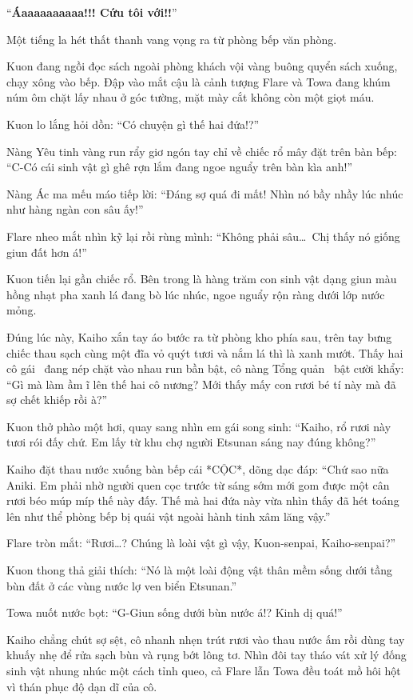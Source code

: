 \documentclass[../main.tex]{subfiles}
\begin{document}
``\textbf{Áaaaaaaaaaa!!! Cứu tôi với!!}''

Một tiếng la hét thất thanh vang vọng ra từ phòng bếp văn phòng.

Kuon đang ngồi đọc sách ngoài phòng khách vội vàng buông quyển sách xuống, chạy xông vào bếp. Đập vào mắt cậu là cảnh tượng Flare và Towa đang khúm núm ôm chặt lấy nhau ở góc tường, mặt mày cắt không còn một giọt máu.

Kuon lo lắng hỏi dồn: ``Có chuyện gì thế hai đứa!?''

Nàng Yêu tinh vàng run rẩy giơ ngón tay chỉ về chiếc rổ mây đặt trên bàn bếp: ``C-Có cái sinh vật gì ghê rợn lắm đang ngoe nguẩy trên bàn kìa anh!''

Nàng Ác ma mếu máo tiếp lời: ``Đáng sợ quá đi mất! Nhìn nó bầy nhầy lúc nhúc như hàng ngàn con sâu ấy!''

Flare nheo mắt nhìn kỹ lại rồi rùng mình: ``Không phải sâu\dots\ Chị thấy nó giống giun đất hơn á!''

Kuon tiến lại gần chiếc rổ. Bên trong là hàng trăm con sinh vật dạng giun màu hồng nhạt pha xanh lá đang bò lúc nhúc, ngoe nguẩy rộn ràng dưới lớp nước mỏng.

Đúng lúc này, Kaiho xắn tay áo bước ra từ phòng kho phía sau, trên tay bưng chiếc thau sạch cùng một đĩa vỏ quýt tươi và nắm lá thì là xanh mướt. Thấy hai cô gái \hll\ đang nép chặt vào nhau run bần bật, cô nàng Tổng quản \hls\ bật cười khẩy: ``Gì mà làm ầm ĩ lên thế hai cô nương? Mới thấy mấy con rươi bé tí này mà đã sợ chết khiếp rồi à?''

Kuon thở phào một hơi, quay sang nhìn em gái song sinh: ``Kaiho, rổ rươi này tươi rói đấy chứ. Em lấy từ khu chợ người Etsunan sáng nay đúng không?''

Kaiho đặt thau nước xuống bàn bếp cái *CỘC*, dõng dạc đáp: ``Chứ sao nữa Aniki. Em phải nhờ người quen cọc trước từ sáng sớm mới gom được một cân rươi béo múp míp thế này đấy. Thế mà hai đứa này vừa nhìn thấy đã hét toáng lên như thể phòng bếp bị quái vật ngoài hành tinh xâm lăng vậy.''

Flare tròn mắt: ``Rươi\dots? Chúng là loài vật gì vậy, Kuon-senpai, Kaiho-senpai?''

Kuon thong thả giải thích: ``Nó là một loài động vật thân mềm sống dưới tầng bùn đất ở các vùng nước lợ ven biển Etsunan.''

Towa nuốt nước bọt: ``G-Giun sống dưới bùn nước á!? Kinh dị quá!''

Kaiho chẳng chút sợ sệt, cô nhanh nhẹn trút rươi vào thau nước ấm rồi dùng tay khuấy nhẹ để rửa sạch bùn và rụng bớt lông tơ. Nhìn đôi tay tháo vát xử lý đống sinh vật nhung nhúc một cách tỉnh queo, cả Flare lẫn Towa đều toát mồ hôi hột vì thán phục độ dạn dĩ của cô.
\end{document}
